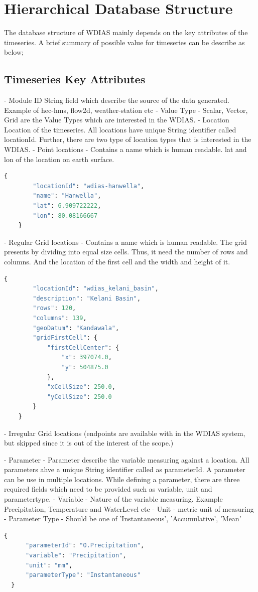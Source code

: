 \section{Hierarchical Database Structure}
 
The database structure of WDIAS mainly depends on the key attributes of the timeseries. A brief summary of possible value for timeseries can be describe as below;

\subsection{Timeseries Key Attributes}
- Module ID
  String field which describe the source of the data generated. Example of hec-hms, flow2d, weather-station etc
- Value Type
  - Scalar, Vector, Grid are the Value Types which are interested in the WDIAS.
- Location
  Location of the timeseries. All locations have unique String identifier called locationId. Further, there are two type of location types that is interested in the WDIAS.
  - Point locations - Contains a name which is human readable. lat and lon of the location on earth surface.
  \begin{lstlisting}[language=Python]
    {
        "locationId": "wdias-hanwella",
        "name": "Hanwella",
        "lat": 6.909722222,
        "lon": 80.08166667
    }
  \end{lstlisting}
  - Regular Grid locations - Contains a name which is human readable. The grid presents by dividing into equal size cells. Thus, it need the number of rows and columns. 
  And the location of the first cell and the width and height of it.
  \begin{lstlisting}[language=Python]
      {
        "locationId": "wdias_kelani_basin",
        "description": "Kelani Basin",
        "rows": 120,
        "columns": 139,
        "geoDatum": "Kandawala",
        "gridFirstCell": {
            "firstCellCenter": {
                "x": 397074.0,
                "y": 504875.0
            },
            "xCellSize": 250.0,
            "yCellSize": 250.0
        }
    }
\end{lstlisting}
  - Irregular Grid locations (endpoints are available with in the WDIAS system, but skipped since it is out of the interest of the scope.)

- Parameter - Parameter describe the variable measuring against a location. All parameters ahve a unique String identifier called as parameterId. A parameter can be use in multiple locations.
While defining a parameter, there are three required fields which need to be provided such as variable, unit and parametertype.
- Variable - Nature of the variable measuring. Example Precipitation, Temperature and WaterLevel etc
- Unit - metric unit of measuring
- Parameter Type - Should be one of 'Instantaneous', 'Accumulative', 'Mean'
  \begin{lstlisting}[language=Python]
  {
      "parameterId": "O.Precipitation",
      "variable": "Precipitation",
      "unit": "mm",
      "parameterType": "Instantaneous"
  }
  \end{lstlisting}

